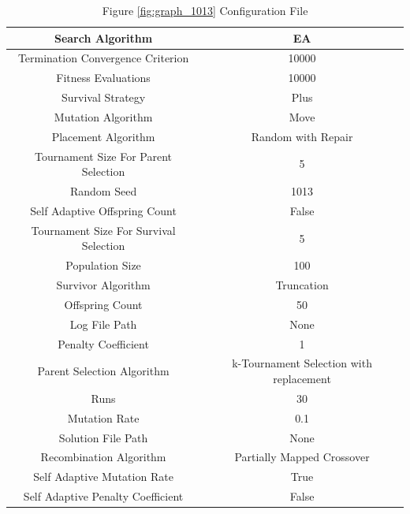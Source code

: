 \documentclass{standalone}
\begin{document}
\begin{table}[!htb]
	\centering
	\caption{Figure \ref{fig:graph_1013} Configuration File}
	\label{tab:graph_1013}
	\begin{tabular}{| c | c |}
		\hline
		Search Algorithm		& EA		 \\
		\hline
		Termination Convergence Criterion		& 10000		 \\
		\hline
		Fitness Evaluations		& 10000		 \\
		\hline
		Survival Strategy		& Plus		 \\
		\hline
		Mutation Algorithm		& Move		 \\
		\hline
		Placement Algorithm		& Random with Repair		 \\
		\hline
		Tournament Size For Parent Selection		& 5		 \\
		\hline
		Random Seed		& 1013		 \\
		\hline
		Self Adaptive Offspring Count		& False		 \\
		\hline
		Tournament Size For Survival Selection		& 5		 \\
		\hline
		Population Size		& 100		 \\
		\hline
		Survivor Algorithm		& Truncation		 \\
		\hline
		Offspring Count		& 50		 \\
		\hline
		Log File Path		& None		 \\
		\hline
		Penalty Coefficient		& 1		 \\
		\hline
		Parent Selection Algorithm		& k-Tournament Selection with replacement		 \\
		\hline
		Runs		& 30		 \\
		\hline
		Mutation Rate		& 0.1		 \\
		\hline
		Solution File Path		& None		 \\
		\hline
		Recombination Algorithm		& Partially Mapped Crossover		 \\
		\hline
		Self Adaptive Mutation Rate		& True		 \\
		\hline
		Self Adaptive Penalty Coefficient		& False		 \\
		\hline
	\end{tabular}
\end{table}
\end{document}
